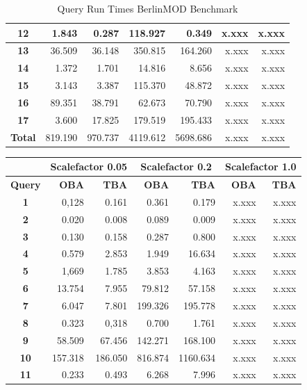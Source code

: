 \documentclass[a4paper]{article}
\newcommand{\bmodb} {BerlinMOD Benchmark}
\begin{document}
{\begin{table}
\begin{scriptsize}
\begin{center}
\begin{tabular}{|c|r|r|r|r|r|r|}
\hline
\textbf{12}&1.843&0.287&118.927&0.349&x.xxx&x.xxx\\
\hline
\textbf{13}&36.509&36.148&350.815&164.260&x.xxx&x.xxx\\
\hline
\textbf{14}&1.372&1.701&14.816&8.656&x.xxx&x.xxx\\
\hline
\textbf{15}&3.143&3.387&115.370&48.872&x.xxx&x.xxx\\
\hline
\textbf{16}&89.351&38.791&62.673&70.790&x.xxx&x.xxx\\
\hline
\textbf{17}&3.600&17.825&179.519&195.433&x.xxx&x.xxx\\
\hline
\textbf{Total}&819.190&970.737&4119.612&5698.686&x.xxx&x.xxx\\
\hline
\end{tabular}
\end{center}
\end{scriptsize}
\caption{Query Run Times \bmodb{}}
\label{tab:rtbmodb}
\end{table}
\begin{table}
\begin{scriptsize}
\begin{center}
\begin{tabular}{|c|r|r|r|r|r|r|}
\hline
&\multicolumn{2}{c|}{\textbf{Scalefactor 0.05}}&\multicolumn{2}{c|}{\textbf{Scalefactor 0.2}}&\multicolumn{2}{c|}{\textbf{Scalefactor 1.0}}\\
\hline
\textbf{Query}&\textbf{OBA}&\textbf{TBA}&\textbf{OBA}&\textbf{TBA}&\textbf{OBA}&\textbf{TBA}\\
\hline
\textbf{1}&0,128&0.161&0.361&0.179&x.xxx&x.xxx\\
\hline
\textbf{2}&0.020&0.008&0.089&0.009&x.xxx&x.xxx\\
\hline
\textbf{3}&0.130&0.158&0.287&0.800&x.xxx&x.xxx\\
\hline
\textbf{4}&0.579&2.853&1.949&16.634&x.xxx&x.xxx\\
\hline
\textbf{5}&1,669&1.785&3.853&4.163&x.xxx&x.xxx\\
\hline
\textbf{6}&13.754&7.955&79.812&57.158&x.xxx&x.xxx\\
\hline
\textbf{7}&6.047&7.801&199.326&195.778&x.xxx&x.xxx\\
\hline
\textbf{8}&0.323&0,318&0.700&1.761&x.xxx&x.xxx\\
\hline
\textbf{9}&58.509&67.456&142.271&168.100&x.xxx&x.xxx\\
\hline
\textbf{10}&157.318&186.050&816.874&1160.634&x.xxx&x.xxx\\
\hline
\textbf{11}&0.233&0.493&6.268&7.996&x.xxx&x.xxx\\

\end{tabular}
\end{center}
\end{scriptsize}
\end{table}}
\end{document}
